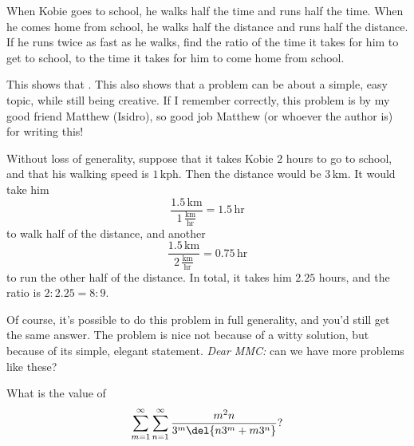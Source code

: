 \documentclass[11pt,paper=letter]{scrartcl}
\begin{document}
\begin{probboxed}
   When Kobie goes to school, he walks half the time and runs half the time. When he comes home from school, he walks half the distance and runs half the distance. If he runs twice as fast as he walks, find the ratio of the time it takes for him to get to school, to the time it takes for him to come home from school.
\end{probboxed}

This shows that . This also shows that a problem can be about a simple, easy topic, while still being creative. If I remember correctly, this problem is by my good friend Matthew (Isidro), so good job Matthew (or whoever the author is) for writing this!

Without loss of generality, suppose that it takes Kobie $2$ hours to go to school, and that his walking speed is $1\,\text{kph}$. Then the distance would be $3\,\text{km}$. It would take him $$\dfrac{1.5\,\text{km}}{1\,\frac{\text{km}}{\text{hr}}} = 1.5\,\text{hr}$$ to walk half of the distance, and another $$\dfrac{1.5\,\text{km}}{2\,\frac{\text{km}}{\text{hr}}} = 0.75\,\text{hr}$$ to run the other half of the distance. In total, it takes him $2.25$ hours, and the ratio is $2 : 2.25 = 8 : 9$.

Of course, it's possible to do this problem in full generality, and you'd still get the same answer. The problem is nice not because of a witty solution, but because of its simple, elegant statement. \emph{Dear MMC:} can we have more problems like these?

\begin{probboxed}
   What is the value of $$\sum_{m=1}^{\infty} \sum_{n=1}^{\infty} \frac{m^2n}{3^m \del{n3^m + m3^n}}?$$
\end{probboxed}
\end{document}
